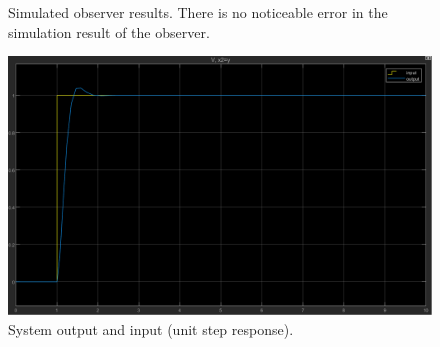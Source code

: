 \documentclass[12pt, oneside]{article}
\begin{document}
        \begin{figure}[htbp]
          \centering
          \hfill%
          \caption{Simulated observer results. There is no noticeable error in the simulation result of the observer.}
        \end{figure}

\begin{figure}
    \centering
    \includegraphics[width = \linewidth]{Report/pics/OutputResult1.png}
    \caption{System output and input (unit step response).}
    \label{fig:OutputResult1}
\end{figure}
\FloatBarrier
\end{document}
